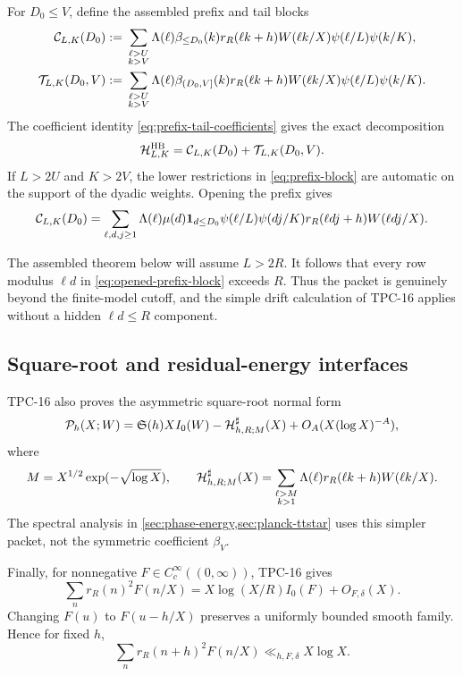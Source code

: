 For $D_0\le V$, define the assembled prefix and tail blocks
\begin{align}
 \mathcal C_{L,K}(D_0)
 :={}&
 \sum_{\substack{\ell>U\\k>V}}
 \Lambda(\ell)\beta_{\le D_0}(k)r_R(\ell k+h)W(\ell k/X)
 \psi(\ell/L)\psi(k/K),
 \label{eq:prefix-block}\\
 \mathcal T_{L,K}(D_0,V)
 :={}&
 \sum_{\substack{\ell>U\\k>V}}
 \Lambda(\ell)\beta_{(D_0,V]}(k)r_R(\ell k+h)W(\ell k/X)
 \psi(\ell/L)\psi(k/K).
 \label{eq:tail-block}
\end{align}
The coefficient identity \eqref{eq:prefix-tail-coefficients} gives the
exact decomposition
\begin{equation}
 \mathcal H^{\mathrm{HB}}_{L,K}
 =\mathcal C_{L,K}(D_0)+\mathcal T_{L,K}(D_0,V).
 \label{eq:exact-prefix-tail-split}
\end{equation}
If $L>2U$ and $K>2V$, the lower restrictions in
\eqref{eq:prefix-block} are automatic on the support of the dyadic
weights.  Opening the prefix gives
\begin{equation}
 \mathcal C_{L,K}(D_0)
 =\sum_{\ell,d,j\ge1}
 \Lambda(\ell)\mu(d)\mathbf 1_{d\le D_0}
 \psi(\ell/L)\psi(dj/K)
 r_R(\ell dj+h)W(\ell dj/X).
 \label{eq:opened-prefix-block}
\end{equation}

The assembled theorem below will assume $L>2R$.  It follows that every
row modulus $\ell d$ in \eqref{eq:opened-prefix-block} exceeds $R$.
Thus the packet is genuinely beyond the finite-model cutoff, and the
simple drift calculation of TPC-16 applies without a hidden
$\ell d\le R$ component.

\subsection{Square-root and residual-energy interfaces}

TPC-16 also proves the asymmetric square-root normal form
\begin{equation}
 \mathcal P_h(X;W)
 =\mathfrak S(h)XI_0(W)-\mathcal H^\sharp_{h,R;M}(X)
 +O_A(X(\log X)^{-A}),
 \label{eq:square-root-interface}
\end{equation}
where
\begin{equation}
 M=X^{1/2}\exp(-\sqrt{\log X}),
 \qquad
 \mathcal H^\sharp_{h,R;M}(X)
 =\sum_{\substack{\ell>M\\k>1}}
 \Lambda(\ell)r_R(\ell k+h)W(\ell k/X).
 \label{eq:square-root-hard-packet}
\end{equation}
The spectral analysis in \cref{sec:phase-energy,sec:planck-ttstar}
uses this simpler packet, not the symmetric coefficient $\beta_V$.

Finally, for nonnegative $F\in C_c^\infty((0,\infty))$, TPC-16 gives
\begin{equation}
 \sum_n r_R(n)^2F(n/X)
 =X\log(X/R)I_0(F)+O_{F,\delta}(X).
 \label{eq:residual-energy-interface}
\end{equation}
Changing $F(u)$ to $F(u-h/X)$ preserves a uniformly bounded smooth
family.  Hence for fixed $h$,
\begin{equation}
 \sum_n r_R(n+h)^2F(n/X)\ll_{h,F,\delta}X\log X.
 \label{eq:shifted-residual-energy}
\end{equation}

